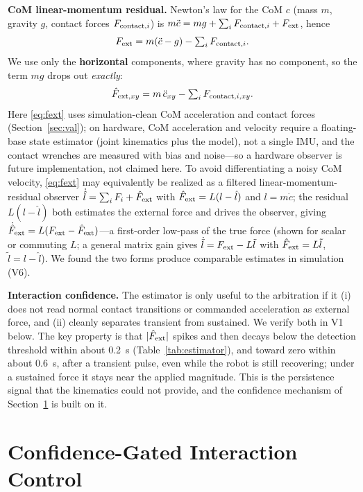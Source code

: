 \documentclass[journal]{IEEEtran}
\begin{document}
\textbf{CoM linear-momentum residual.} Newton's law for the CoM $c$ (mass $m$, gravity $g$, contact forces $F_{{\rm contact},i}$) \cite{r8} is $m\ddot c=mg+\sum_i F_{{\rm contact},i}+F_{\rm ext}$, hence
\begin{equation}
F_{\rm ext}=m(\ddot c-g)-\textstyle\sum_i F_{{\rm contact},i}.
\label{eq:newton}
\end{equation}
We use only the \textbf{horizontal} components, where gravity has no component, so the term $mg$ drops out \emph{exactly}:
\begin{equation}
\hat F_{{\rm ext},xy}=m\,\ddot c_{xy}-\textstyle\sum_i F_{{\rm contact},i,xy}.
\label{eq:fext}
\end{equation}
Here \eqref{eq:fext} uses simulation-clean CoM acceleration and contact forces (Section~\ref{sec:val}); on hardware, CoM acceleration and velocity require a floating-base state estimator (joint kinematics plus the model), not a single IMU, and the contact wrenches are measured with bias and noise---so a hardware observer is future implementation, not claimed here. To avoid differentiating a noisy CoM velocity, \eqref{eq:fext} may equivalently be realized as a filtered linear-momentum-residual observer $\dot{\hat l}=\sum_iF_i+\hat F_{\rm ext}$ with $\hat F_{\rm ext}=L(l-\hat l)$ and $l=m\dot c$; the residual $L(l-\hat l)$ both estimates the external force and drives the observer, giving $\dot{\hat F}_{\rm ext}=L(F_{\rm ext}-\hat F_{\rm ext})$---a first-order low-pass of the true force (shown for scalar or commuting $L$; a general matrix gain gives $\dot{\tilde l}=F_{\rm ext}-L\tilde l$ with $\hat F_{\rm ext}=L\tilde l$, $\tilde l=l-\hat l$). We found the two forms produce comparable estimates in simulation (V6).

\textbf{Interaction confidence.} The estimator is only useful to the arbitration if it (i) does not read normal contact transitions or commanded acceleration as external force, and (ii) cleanly separates transient from sustained. We verify both in V1 below. The key property is that $|\hat F_{\rm ext}|$ spikes and then decays below the detection threshold within about 0.2~s (Table~\ref{tab:estimator}), and toward zero within about 0.6~s, after a transient pulse, even while the robot is still recovering; under a sustained force it stays near the applied magnitude. This is the persistence signal that the kinematics could not provide, and the confidence mechanism of Section~\ref{sec:control} is built on it.

\section{Confidence-Gated Interaction Control}
\label{sec:control}
\end{document}
